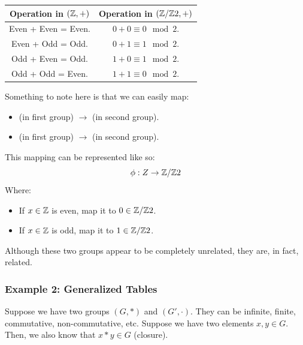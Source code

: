 \documentclass[letterpaper]{article}
\begin{document}
\begin{center}
    \begin{tabular}{c|c}
        Operation in $(\mathbb{Z}, +)$ & Operation in $(\mathbb{Z} / \mathbb{Z} 2, +)$ \\ 
        \hline 
        Even + Even = Even. & $0 + 0 \equiv 0 \mod{2}$. \\ 
        Even + Odd = Odd. & $0 + 1 \equiv 1 \mod{2}$. \\ 
        Odd + Even = Odd. & $1 + 0 \equiv 1 \mod{2}$. \\ 
        Odd + Odd = Even. & $1 + 1 \equiv 0 \mod{2}$.
    \end{tabular}
\end{center}

Something to note here is that we can easily map:
\begin{itemize}
    \item {} (in first group) $\to$  (in second group).
    \item {} (in first group) $\to$  (in second group).
\end{itemize}
This mapping can be represented like so: 
\[\phi: Z \to \mathbb{Z} / \mathbb{Z} 2\]
Where: 
\begin{itemize}
    \item If $x \in \mathbb{Z}$ is even, map it to $0 \in \mathbb{Z} / \mathbb{Z} 2$. 
    \item If $x \in \mathbb{Z}$ is odd, map it to $1 \in \mathbb{Z} / \mathbb{Z} 2$. 
\end{itemize}
Although these two groups appear to be completely unrelated, they are, in fact, related. 

\subsubsection{Example 2: Generalized Tables}
Suppose we have two groups $(G, *)$ and $(G', \cdot)$. They can be infinite, finite, commutative, non-commutative, etc. Suppose we have two elements $x, y \in G$. Then, we also know that $x * y \in G$ (closure). 

\bigskip 
\end{document}
